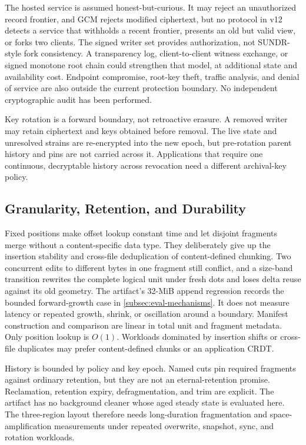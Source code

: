 The hosted service is assumed honest-but-curious.  It may reject an
unauthorized record frontier, and GCM rejects modified ciphertext, but no
protocol in v12 detects a service that withholds a recent frontier, presents an
old but valid view, or forks two clients.  The signed writer set provides
authorization, not SUNDR-style fork consistency.  A transparency log,
client-to-client witness exchange, or signed monotone root chain could strengthen
that model, at additional state and availability cost.  Endpoint compromise,
root-key theft, traffic analysis, and denial of service are also outside the
current protection boundary.  No independent cryptographic audit has been
performed.

Key rotation is a forward boundary, not retroactive erasure.  A removed writer
may retain ciphertext and keys obtained before removal.  The live state and
unresolved strains are re-encrypted into the new epoch, but pre-rotation parent
history and pins are not carried across it.  Applications that require one
continuous, decryptable history across revocation need a different archival-key
policy.

\subsection{Granularity, Retention, and Durability}

Fixed positions make offset lookup constant time and let disjoint fragments
merge without a content-specific data type.  They deliberately give up the
insertion stability and cross-file deduplication of content-defined chunking.
Two concurrent edits to different bytes in one fragment still conflict, and a
size-band transition rewrites the complete logical unit under fresh dots and
loses delta reuse against its old geometry.  The artifact's 32-MiB append
regression records the bounded forward-growth case in
\cref{subsec:eval-mechanisms}.  It does not measure latency or repeated growth,
shrink, or oscillation around a boundary.  Manifest construction and comparison
are linear in total unit and fragment metadata.  Only position lookup is
\(O(1)\).  Workloads dominated by insertion shifts or cross-file duplicates
may prefer content-defined chunks or an application CRDT.

History is bounded by policy and key epoch.  Named cuts pin required fragments
against ordinary retention, but they are not an eternal-retention promise.
Reclamation, retention expiry, defragmentation, and trim are explicit.  The
artifact has no background cleaner whose aged steady state is evaluated here.
The three-region layout therefore needs long-duration fragmentation and
space-amplification measurements under repeated overwrite, snapshot, sync, and
rotation workloads.


